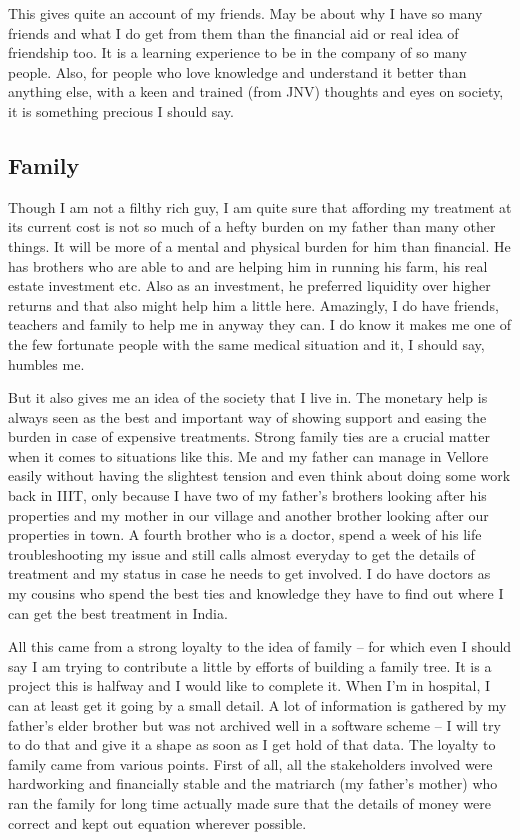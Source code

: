 This gives quite an account of my friends. May be  about why I have so many friends and what I do get from 
them than the financial aid or real idea of friendship too. It is a learning experience to be in the company 
of so many people. Also, for people who love knowledge and understand it better than anything else, with a keen 
and trained (from JNV) thoughts and eyes on society, it is something precious I should say.   


\subsection*{Family}
   
Though I am not a filthy rich guy, I am quite sure that affording my treatment at its current cost is not so 
much of a hefty burden on my father than many other things. It will be more of a mental and physical 
burden for him than financial. He has brothers who are able to and are helping him in running his farm, 
his real estate investment etc. Also as an investment, he preferred liquidity over higher returns 
and that also might help him a little here. Amazingly, I do have friends, teachers and family to 
help me in anyway they can. I do know it makes me one of the few fortunate people with the same 
medical situation and it, I should say, humbles me. 

But it also gives me an idea of the society that I live in. The monetary help is always seen as the best 
and important way of showing support and easing the burden in case of expensive treatments. 
Strong family ties are a crucial matter when it comes to situations like this. Me and my father can 
manage in Vellore easily without having the slightest tension and even think about doing some work back in IIIT, only 
because I have two of my father's brothers looking after his properties and my mother in our 
village and another brother looking after our properties in town. A fourth brother who is a doctor, 
spend a week of his life troubleshooting my issue and still calls almost everyday to get the 
details of treatment and my status in case he needs to get involved. I do have doctors as my cousins 
who spend the best ties and knowledge they have to find out where I can get the best treatment in India. 

All this came from a strong loyalty to the idea of family -- for which even I should say I am
trying to contribute a little by efforts of building a family tree. It is a project this is halfway and I would 
like to complete it. When I'm in hospital, I can at least get it going by a small detail. A lot of
information is gathered by my father's elder brother but was not archived well in a software scheme 
-- I will try to do that and give it a shape as soon as I get hold of that data. The loyalty to 
family came from various points. First of all, all the stakeholders involved were hardworking and
financially stable and the matriarch (my father's mother) who ran the family for long time actually 
made sure that the details of money were correct and kept out equation wherever possible. 

